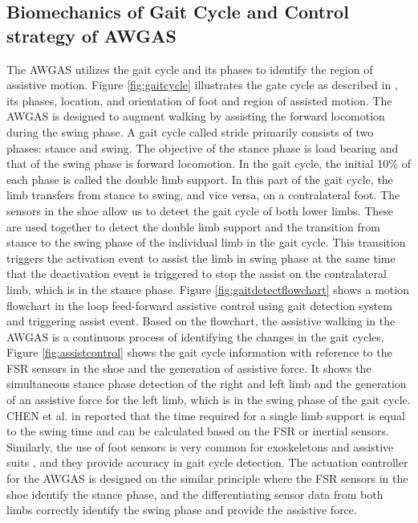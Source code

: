 \documentclass[paper,JRM,paper]{jaciiiarticle}
\begin{document}

\subsection{Biomechanics of Gait Cycle and Control strategy of AWGAS}

The AWGAS utilizes the gait cycle and its phases to identify the region of assistive motion. Figure \ref{fig:gaitcycle} illustrates the gate cycle as described in \cite{12}, its phases, location, and orientation of foot and region of assisted motion. The AWGAS is designed to augment walking by assisting the forward locomotion during the swing phase. A gait cycle called stride primarily consists of two phases: stance and swing. The objective of the stance phase is load bearing and that of the swing phase is forward locomotion. In the gait cycle, the initial 10\% of each phase is called the double limb support. In this part of the gait cycle, the limb transfers from stance to swing, and vice versa, on a contralateral foot. The sensors in the shoe allow us to detect the gait cycle of both lower limbs. These are used together to detect the double limb support and the transition from stance to the swing phase of the individual limb in the gait cycle. This transition triggers the activation event to assist the limb in swing phase at the same time that the deactivation event is triggered to stop the assist on the contralateral limb, which is in the stance phase. Figure \ref{fig:gaitdetectflowchart} shows a motion flowchart in the loop feed-forward assistive control using gait detection system and triggering assist event. Based on the flowchart, the assistive walking in the AWGAS is a continuous process of identifying the changes in the gait cycles. Figure \ref{fig:assistcontrol} shows the gait cycle information with reference to the FSR sensors in the shoe and the generation of assistive force. It shows the simultaneous stance phase detection of the right and left limb and the generation of an assistive force for the left limb, which is in the swing phase of the gait cycle. CHEN  et al. in \cite{13} reported that the time required for a single limb support is equal to the swing time and can be calculated based on the FSR or inertial sensors. Similarly, the use of foot sensors is very common for exoskeletons and assistive suits \cite{14,15,16,17,18,19,20,21}, and they provide accuracy in gait cycle detection. The actuation controller for the AWGAS is designed on the similar principle where the FSR sensors in the shoe identify the stance phase, and the differentiating sensor data from both limbs correctly identify the swing phase and provide the assistive force.
\end{document}
